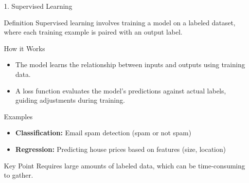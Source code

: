 \documentclass[aspectratio=169]{beamer}
\begin{document}
\begin{frame}{1. Supervised Learning}
    \begin{block}{Definition}
        Supervised learning involves training a model on a labeled dataset, where each training example is paired with an output label.
    \end{block}
    
    \begin{block}{How it Works}
        \begin{itemize}
            \item The model learns the relationship between inputs and outputs using training data.
            \item A loss function evaluates the model's predictions against actual labels, guiding adjustments during training.
        \end{itemize}
    \end{block}

    \begin{block}{Examples}
        \begin{itemize}
            \item \textbf{Classification:} Email spam detection (spam or not spam)
            \item \textbf{Regression:} Predicting house prices based on features (size, location)
        \end{itemize}
    \end{block}
    
    \begin{block}{Key Point}
        Requires large amounts of labeled data, which can be time-consuming to gather.
    \end{block}
\end{frame}
\end{document}
